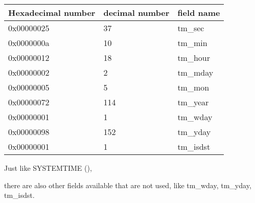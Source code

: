 \begin{center}
\begin{tabular}{ | l | l | l | }
\hline
\headercolor{} Hexadecimal number & 
\headercolor{} decimal number & 
\headercolor{} field name \\
\hline
0x00000025 & 37 	& tm\_sec \\
\hline
0x0000000a & 10 	& tm\_min \\
\hline
0x00000012 & 18 	& tm\_hour \\	
\hline
0x00000002 & 2 		& tm\_mday \\	
\hline
0x00000005 & 5 		& tm\_mon \\	
\hline
0x00000072 & 114 	& tm\_year \\
\hline
0x00000001 & 1 		& tm\_wday \\	
\hline
0x00000098 & 152 	& tm\_yday \\	
\hline
0x00000001 & 1 		& tm\_isdst \\
\hline
\end{tabular}
\end{center}

Just like SYSTEMTIME (), 

there are also other fields available that are not used, like tm\_wday, tm\_yday, tm\_isdst.
